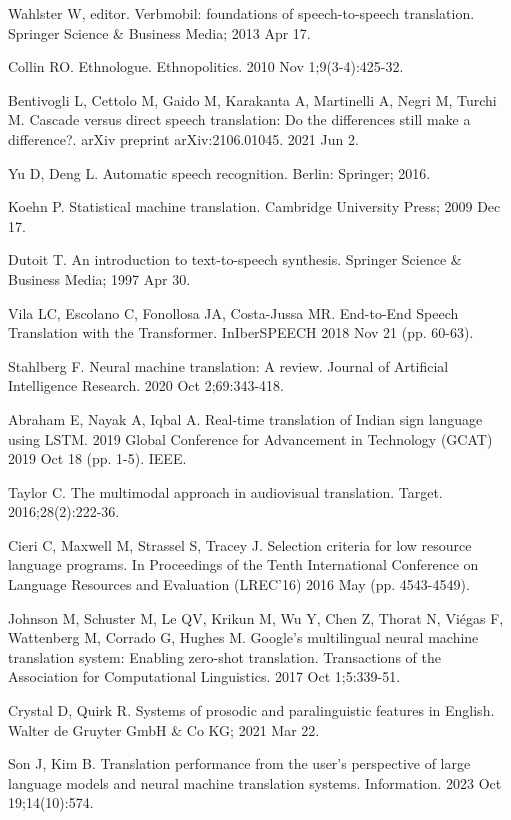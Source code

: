 \documentclass[12pt]{article}
\begin{document}
\begin{thebibliography}{9}
Wahlster W, editor. Verbmobil: foundations of speech-to-speech translation. Springer Science \& Business Media; 2013 Apr 17.

Collin RO. Ethnologue. Ethnopolitics. 2010 Nov 1;9(3-4):425-32.

Bentivogli L, Cettolo M, Gaido M, Karakanta A, Martinelli A, Negri M, Turchi M. Cascade versus direct speech translation: Do the differences still make a difference?. arXiv preprint arXiv:2106.01045. 2021 Jun 2.

Yu D, Deng L. Automatic speech recognition. Berlin: Springer; 2016.

Koehn P. Statistical machine translation. Cambridge University Press; 2009 Dec 17.

Dutoit T. An introduction to text-to-speech synthesis. Springer Science \& Business Media; 1997 Apr 30.

Vila LC, Escolano C, Fonollosa JA, Costa-Jussa MR. End-to-End Speech Translation with the Transformer. InIberSPEECH 2018 Nov 21 (pp. 60-63).

Stahlberg F. Neural machine translation: A review. Journal of Artificial Intelligence Research. 2020 Oct 2;69:343-418.

Abraham E, Nayak A, Iqbal A. Real-time translation of Indian sign language using LSTM. 2019 Global Conference for Advancement in Technology (GCAT) 2019 Oct 18 (pp. 1-5). IEEE.

Taylor C. The multimodal approach in audiovisual translation. Target. 2016;28(2):222-36.

Cieri C, Maxwell M, Strassel S, Tracey J. Selection criteria for low resource language programs. In Proceedings of the Tenth International Conference on Language Resources and Evaluation (LREC'16) 2016 May (pp. 4543-4549).

Johnson M, Schuster M, Le QV, Krikun M, Wu Y, Chen Z, Thorat N, Viégas F, Wattenberg M, Corrado G, Hughes M. Google’s multilingual neural machine translation system: Enabling zero-shot translation. Transactions of the Association for Computational Linguistics. 2017 Oct 1;5:339-51.

Crystal D, Quirk R. Systems of prosodic and paralinguistic features in English. Walter de Gruyter GmbH \& Co KG; 2021 Mar 22.

Son J, Kim B. Translation performance from the user’s perspective of large language models and neural machine translation systems. Information. 2023 Oct 19;14(10):574.


\end{thebibliography}
\end{document}
